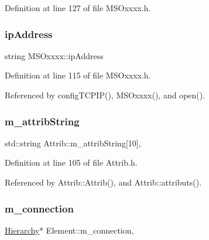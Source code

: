 Definition at line 127 of file M\+S\+Oxxxx.\+h.

\mbox{\label{classMSOxxxx_aa55bdb0feb799b195628fe6ef0222b62}} 
\subsubsection{\texorpdfstring{ip\+Address}{ipAddress}}
{\footnotesize\ttfamily string M\+S\+Oxxxx\+::ip\+Address\hspace{0.3cm}{\ttfamily [private]}}



Definition at line 115 of file M\+S\+Oxxxx.\+h.



Referenced by config\+T\+C\+P\+I\+P(), M\+S\+Oxxxx(), and open().

\mbox{\label{classAttrib_a3414521d7a82476e874b25a5407b5e63}} 
\subsubsection{\texorpdfstring{m\+\_\+attrib\+String}{m\_attribString}}
{\footnotesize\ttfamily std\+::string Attrib\+::m\+\_\+attrib\+String\mbox{[}10\mbox{]}\hspace{0.3cm}{\ttfamily [protected]}, {\ttfamily [inherited]}}



Definition at line 105 of file Attrib.\+h.



Referenced by Attrib\+::\+Attrib(), and Attrib\+::attributs().

\mbox{\label{classElement_abe3de7a5dbbc9a6dd2d7e012e5fdb266}} 
\subsubsection{\texorpdfstring{m\+\_\+connection}{m\_connection}}
{\footnotesize\ttfamily \hyperlink{classHierarchy}{Hierarchy}$\ast$ Element\+::m\+\_\+connection\hspace{0.3cm}{\ttfamily [protected]}, {\ttfamily [inherited]}}



